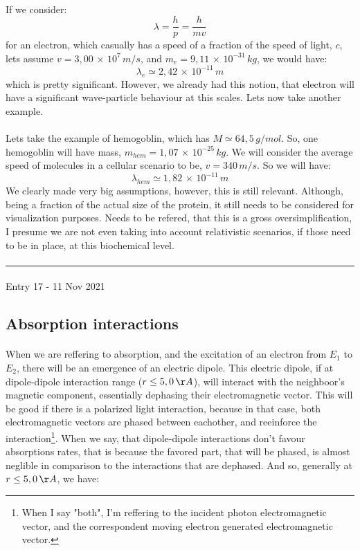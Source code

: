 \documentclass[12pt,  letterpaper]{article}
\begin{document}
\paragraph*{}
If we consider:
\begin{equation}
\lambda = \frac{h}{p} = \frac{h}{mv}
\end{equation}
for an electron, which casually has a speed of a fraction of the speed of light, $c$, lets assume $v = 3,00\,\times\,10^{7}\,m/s$, and $m_{e} = 9,11\,\times\,10^{-31}\,kg$, we would have:
$$\lambda_{e} \simeq 2,42\,\times\,10^{-11}\,m$$
which is pretty significant. However, we already had this notion, that electron will have a significant wave-particle behaviour at this scales. Lets now take another example.
\paragraph*{}
Lets take the example of hemogoblin, which has $M \simeq 64,5\,g/mol$. So, one hemogoblin will have mass, $m_{hem} = 1,07\,\times\,10^{-25}\,kg$. We will consider the average speed of molecules in a cellular scenario to be, $v = 340\,m/s$. So we will have:
$$\lambda_{hem} \simeq 1,82\,\times\,10^{-11}\,m$$
We clearly made very big assumptions, however, this is still relevant. Although, being a fraction of the actual size of the protein, it still needs to be considered for visualization purposes. Needs to be refered, that this is a gross oversimplification, I presume we are not even taking into account relativistic scenarios, if those need to be in place, at this biochemical level.
\paragraph*{}
\hrule
\paragraph*{	}
Entry 17 - 11 Nov 2021
\subsection*{Absorption interactions}
\paragraph*{}
When we are reffering to absorption, and the excitation of an electron from $E_{1}$ to  $E_{2}$, there will be an emergence of an electric dipole. This electric dipole, if at dipole-dipole interaction range ($r \leq 5,0\,\AA$), will interact with the neighboor's magnetic component, essentially dephasing their electromagnetic vector. This will be good if there is a polarized light interaction, because in that case, both electromagnetic vectors are phased between eachother, and reeinforce the interaction\footnote{When I say "both", I'm reffering to the incident photon electromagnetic vector, and the correspondent moving electron generated electromagnetic vector.}. When we say, that dipole-dipole interactions don't favour absorptions rates, that is because the favored part, that will be phased, is almost neglible in comparison to the interactions that are dephased. And so, generally at $r \leq 5,0\,\AA$, we have:
\end{document}
